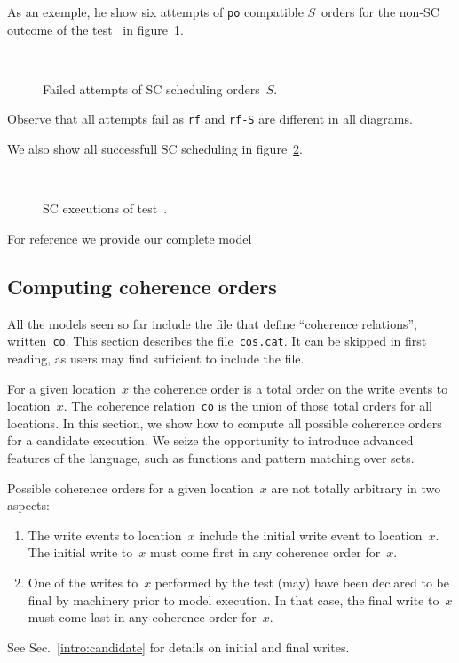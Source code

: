As an exemple, he show six attempts of \texttt{po} compatible $S$~orders
for the non-SC outcome of the test~ in figure~\ref{sblamport}.
\begin{figure}[htp]
\caption{\label{sblamport}Failed attempts of SC scheduling orders~$S$.}
\begin{center}
\quad{}\quad{}\\
\quad{}\quad{}
\end{center}
\end{figure}
Observe that all attempts fail as \texttt{rf} and \texttt{rf-S}
are different in all diagrams.

We also show all successfull SC scheduling in figure~\ref{sbok}.
\begin{figure}[htp]
\caption{\label{sbok}SC executions of test~.}
\begin{center}
\quad{}\quad{}\\
\quad{}\quad{}
\end{center}
\end{figure}


For reference we provide our complete model~


\subsection{Computing \label{sec:cos}coherence orders}
All the models seen so far include the file  that define
``coherence relations'', written~\texttt{co}.
This section describes the file~\texttt{cos.cat}.
It can be skipped in first reading, as users may find sufficient
to include the file.

For a given location~$x$ the coherence order is a total order on the
write events to location~$x$. The coherence relation~\texttt{co} is the union
of those total orders for all locations.
In this section, we show how to compute all possible coherence orders for
a candidate execution.
We seize the opportunity to introduce advanced features of the \cat{}
language, such as functions and pattern matching over sets.

Possible coherence orders for a given location~$x$
are not totally arbitrary in two aspects:
\begin{enumerate}
\item The write events to location~$x$ include
the initial write event to location~$x$.  The initial write to~$x$ must come
first in any coherence order for~$x$.
\item One of the writes to~$x$ performed by the test (may) have been declared
to be final by \herd{} machinery prior to model execution.
In that case, the final write to~$x$ must come last in any coherence order
for~$x$.
\end{enumerate}
See Sec.~\ref{intro:candidate} for details on initial and final writes.

